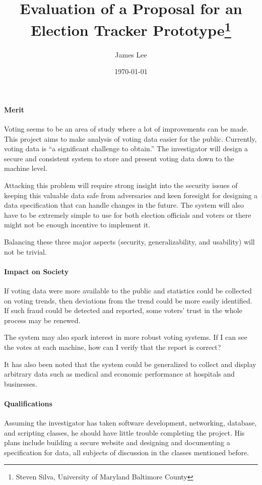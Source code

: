 \documentclass{article}
\title{Evaluation of a Proposal for an Election Tracker Prototype\thanks{Steven Silva, University of Maryland Baltimore County}}
\author{James Lee}
\date{\today}
\begin{document}
\maketitle

\paragraph{Merit} Voting seems to be an area of study where a lot of improvements can be made.  This project aims to make analysis of voting data easier for the public.  Currently, voting data is ``a significant challenge to obtain.''  The investigator will design a secure and consistent system to store and present voting data down to the machine level.

Attacking this problem will require strong insight into the security issues of keeping this valuable data safe from adversaries and keen foresight for designing a data specification that can handle changes in the future.  The system will also have to be extremely simple to use for both election officials and voters or there might not be enough incentive to implement it.

Balancing these three major aspects (security, generalizability, and usability) will not be trivial.

\paragraph{Impact on Society} If voting data were more available to the public and statistics could be collected on voting trends, then deviations from the trend could be more easily identified.  If such fraud could be detected and reported, some voters' trust in the whole process may be renewed.

The system may also spark interest in more robust voting systems.  If I can see the votes at each machine, how can I verify that the report is correct?

It has also been noted that the system could be generalized to collect and display arbitrary data such as medical and economic performance at hospitals and businesses.

\paragraph{Qualifications}
Assuming the investigator has taken software development, networking, database, and scripting classes, he should have little trouble completing the project.  His plans include building a secure website and designing and documenting a specification for data, all subjects of discussion in the classes mentioned before.
\end{document}
